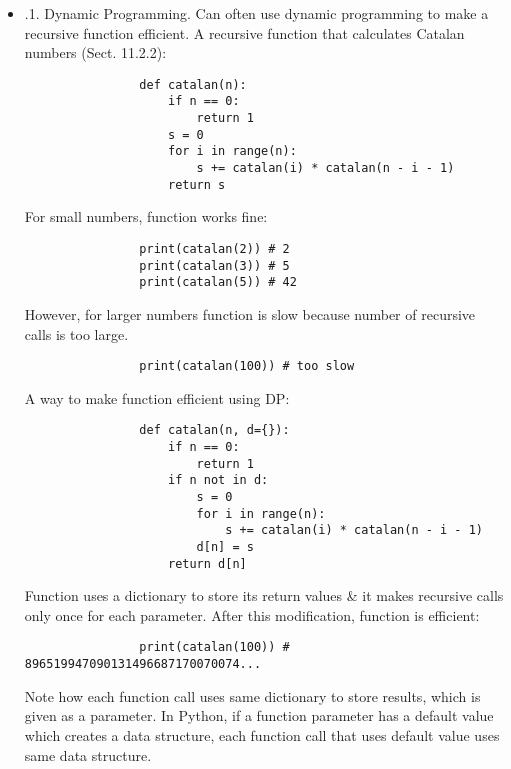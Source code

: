 \documentclass{article}
\begin{document}
\begin{itemize}
\begin{itemize}
		\begin{itemize}
			\item {.1. Dynamic Programming.} Can often use dynamic programming to make a recursive function efficient. A recursive function that calculates Catalan numbers (Sect. 11.2.2):
			\begin{verbatim}
				def catalan(n):
				    if n == 0:
				        return 1
				    s = 0
				    for i in range(n):
				        s += catalan(i) * catalan(n - i - 1)
				    return s
			\end{verbatim}
			For small numbers, function works fine:
			\begin{verbatim}
				print(catalan(2)) # 2
				print(catalan(3)) # 5
				print(catalan(5)) # 42
			\end{verbatim}
			However, for larger numbers function is slow because number of recursive calls is too large.
			\begin{verbatim}
				print(catalan(100)) # too slow
			\end{verbatim}
			A way to make function efficient using DP:
			\begin{verbatim}
				def catalan(n, d={}):
				    if n == 0:
				        return 1
				    if n not in d:
				        s = 0
				        for i in range(n):
				            s += catalan(i) * catalan(n - i - 1)
				        d[n] = s
				    return d[n]
			\end{verbatim}
			Function uses a dictionary to store its return values \& it makes recursive calls only once for each parameter. After this modification, function is efficient:
			\begin{verbatim}
				print(catalan(100)) # 896519947090131496687170070074...
			\end{verbatim}
			Note how each function call uses same dictionary to store results, which is given as a parameter. In Python, if a function parameter has a default value which creates a data structure, each function call that uses default value uses same data structure.
			

\end{itemize}
\end{itemize}
\end{itemize}
\end{document}
